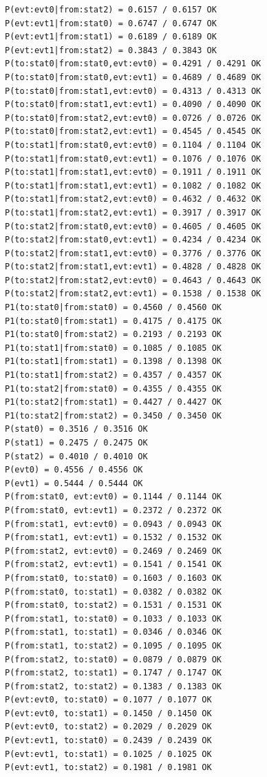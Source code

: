 \documentclass[12pt, a4paper]{article}
\begin{document}
\begin{scriptsize}
\begin{ttfamily}
\begin{lstlisting}
P(evt:evt0|from:stat2) = 0.6157 / 0.6157 OK
P(evt:evt1|from:stat0) = 0.6747 / 0.6747 OK
P(evt:evt1|from:stat1) = 0.6189 / 0.6189 OK
P(evt:evt1|from:stat2) = 0.3843 / 0.3843 OK
P(to:stat0|from:stat0,evt:evt0) = 0.4291 / 0.4291 OK
P(to:stat0|from:stat0,evt:evt1) = 0.4689 / 0.4689 OK
P(to:stat0|from:stat1,evt:evt0) = 0.4313 / 0.4313 OK
P(to:stat0|from:stat1,evt:evt1) = 0.4090 / 0.4090 OK
P(to:stat0|from:stat2,evt:evt0) = 0.0726 / 0.0726 OK
P(to:stat0|from:stat2,evt:evt1) = 0.4545 / 0.4545 OK
P(to:stat1|from:stat0,evt:evt0) = 0.1104 / 0.1104 OK
P(to:stat1|from:stat0,evt:evt1) = 0.1076 / 0.1076 OK
P(to:stat1|from:stat1,evt:evt0) = 0.1911 / 0.1911 OK
P(to:stat1|from:stat1,evt:evt1) = 0.1082 / 0.1082 OK
P(to:stat1|from:stat2,evt:evt0) = 0.4632 / 0.4632 OK
P(to:stat1|from:stat2,evt:evt1) = 0.3917 / 0.3917 OK
P(to:stat2|from:stat0,evt:evt0) = 0.4605 / 0.4605 OK
P(to:stat2|from:stat0,evt:evt1) = 0.4234 / 0.4234 OK
P(to:stat2|from:stat1,evt:evt0) = 0.3776 / 0.3776 OK
P(to:stat2|from:stat1,evt:evt1) = 0.4828 / 0.4828 OK
P(to:stat2|from:stat2,evt:evt0) = 0.4643 / 0.4643 OK
P(to:stat2|from:stat2,evt:evt1) = 0.1538 / 0.1538 OK
P1(to:stat0|from:stat0) = 0.4560 / 0.4560 OK
P1(to:stat0|from:stat1) = 0.4175 / 0.4175 OK
P1(to:stat0|from:stat2) = 0.2193 / 0.2193 OK
P1(to:stat1|from:stat0) = 0.1085 / 0.1085 OK
P1(to:stat1|from:stat1) = 0.1398 / 0.1398 OK
P1(to:stat1|from:stat2) = 0.4357 / 0.4357 OK
P1(to:stat2|from:stat0) = 0.4355 / 0.4355 OK
P1(to:stat2|from:stat1) = 0.4427 / 0.4427 OK
P1(to:stat2|from:stat2) = 0.3450 / 0.3450 OK
P(stat0) = 0.3516 / 0.3516 OK
P(stat1) = 0.2475 / 0.2475 OK
P(stat2) = 0.4010 / 0.4010 OK
P(evt0) = 0.4556 / 0.4556 OK
P(evt1) = 0.5444 / 0.5444 OK
P(from:stat0, evt:evt0) = 0.1144 / 0.1144 OK
P(from:stat0, evt:evt1) = 0.2372 / 0.2372 OK
P(from:stat1, evt:evt0) = 0.0943 / 0.0943 OK
P(from:stat1, evt:evt1) = 0.1532 / 0.1532 OK
P(from:stat2, evt:evt0) = 0.2469 / 0.2469 OK
P(from:stat2, evt:evt1) = 0.1541 / 0.1541 OK
P(from:stat0, to:stat0) = 0.1603 / 0.1603 OK
P(from:stat0, to:stat1) = 0.0382 / 0.0382 OK
P(from:stat0, to:stat2) = 0.1531 / 0.1531 OK
P(from:stat1, to:stat0) = 0.1033 / 0.1033 OK
P(from:stat1, to:stat1) = 0.0346 / 0.0346 OK
P(from:stat1, to:stat2) = 0.1095 / 0.1095 OK
P(from:stat2, to:stat0) = 0.0879 / 0.0879 OK
P(from:stat2, to:stat1) = 0.1747 / 0.1747 OK
P(from:stat2, to:stat2) = 0.1383 / 0.1383 OK
P(evt:evt0, to:stat0) = 0.1077 / 0.1077 OK
P(evt:evt0, to:stat1) = 0.1450 / 0.1450 OK
P(evt:evt0, to:stat2) = 0.2029 / 0.2029 OK
P(evt:evt1, to:stat0) = 0.2439 / 0.2439 OK
P(evt:evt1, to:stat1) = 0.1025 / 0.1025 OK
P(evt:evt1, to:stat2) = 0.1981 / 0.1981 OK

\end{lstlisting}
\end{ttfamily}
\end{scriptsize}
\end{document}
